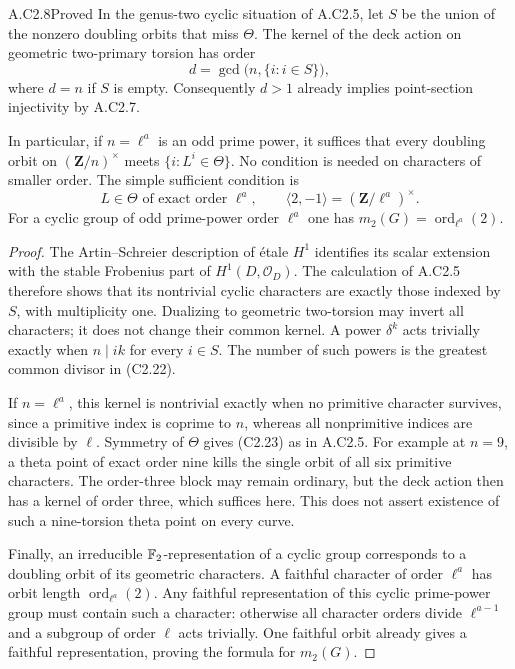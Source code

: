 \begin{claim}{A.C2.8}{Proved}
In the genus-two cyclic situation of A.C2.5, let $S$ be the
union of the nonzero doubling orbits that miss $\Theta$.
The kernel of the deck action on geometric two-primary torsion
has order
\[
                    d=\gcd\bigl(n,\{i:i\in S\}\bigr),        \tag{C2.22}
\]
where $d=n$ if $S$ is empty. Consequently $d>1$ already implies
point-section injectivity by A.C2.7.

In particular, if $n=\ell^a$ is an odd prime power, it suffices
that every doubling orbit on $(\mathbf Z/n)^\times$ meets
$\{i:L^i\in\Theta\}$. No condition is needed on characters
of smaller order. The simple sufficient condition is
\[
 L\in\Theta\text{ of exact order }\ell^a,\qquad
                 \langle2,-1\rangle=(\mathbf Z/\ell^a)^\times.
                                                               \tag{C2.23}
\]
For a cyclic group of odd prime-power order $\ell^a$ one has
$m_2(G)=\operatorname{ord}_{\ell^a}(2)$.
\end{claim}
\begin{proof}
The Artin--Schreier description of \'etale $H^1$ identifies its
scalar extension with the stable Frobenius part of
$H^1(D,\mathcal O_D)$. The calculation of A.C2.5 therefore
shows that its nontrivial cyclic characters are exactly those
indexed by $S$, with multiplicity one. Dualizing to geometric
two-torsion may invert all characters; it does not change
their common kernel. A power $\delta^k$ acts trivially exactly
when $n\mid ik$ for every $i\in S$. The number of such powers
is the greatest common divisor in (C2.22).

If $n=\ell^a$, this kernel is nontrivial exactly when no
primitive character survives, since a primitive index is
coprime to $n$, whereas all nonprimitive indices are divisible
by $\ell$. Symmetry of $\Theta$ gives (C2.23) as in A.C2.5.
For example at $n=9$, a theta point of exact order nine kills
the single orbit of all six primitive characters. The
order-three block may remain ordinary, but the deck action
then has a kernel of order three, which suffices here. This
does not assert existence of such a nine-torsion theta point
on every curve.

Finally, an irreducible $\mathbb F_2$-representation of a cyclic
group corresponds to a doubling orbit of its geometric
characters. A faithful character of order $\ell^a$ has orbit
length $\operatorname{ord}_{\ell^a}(2)$. Any faithful
representation of this cyclic prime-power group must contain
such a character: otherwise all character orders divide
$\ell^{a-1}$ and a subgroup of order $\ell$ acts trivially.
One faithful orbit already gives a faithful representation,
proving the formula for $m_2(G)$.
\end{proof}

